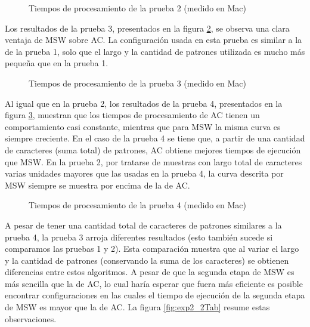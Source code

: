 {\begin{figure}[H]
{	\label{fig:Prueba2Tab_c}}
\quad
\caption{Tiempos de procesamiento de la prueba 2 (medido en Mac)}
\label{fig:Prueba2Tab}
\end{figure}
Los resultados de la prueba 3, presentados en la figura \ref{fig:Prueba3Tab}, se observa una clara ventaja de MSW sobre AC. La configuración usada en esta prueba es similar a la de la prueba 1, solo que el largo y la cantidad de patrones utilizada es mucho más pequeña que en la prueba 1.
\begin{figure}[H]
\centering
\quad
\quad
\quad
\caption{Tiempos de procesamiento de la prueba 3 (medido en Mac)}
\label{fig:Prueba3Tab}
\end{figure}
Al igual que en la prueba 2, los resultados de la prueba 4, presentados en la figura \ref{fig:Prueba4Tab}, muestran que los tiempos de procesamiento de AC tienen un comportamiento casi constante, mientras que para MSW la misma curva es siempre creciente. En el caso de la prueba 4 se tiene que, a partir de una cantidad de caracteres (suma total) de patrones, AC obtiene mejores tiempos de ejecución que MSW. En la prueba 2, por tratarse de muestras con largo total de caracteres varias unidades mayores que las usadas en la prueba 4, la curva descrita por MSW siempre se muestra por encima de la de AC.
\begin{figure}[H]
\centering
\quad
\quad
\quad
\caption{Tiempos de procesamiento de la prueba 4 (medido en Mac)}
\label{fig:Prueba4Tab}
\end{figure}
A pesar de tener una cantidad total de caracteres de patrones similares a la prueba 4, la prueba 3 arroja diferentes resultados (esto también sucede si comparamos las pruebas 1 y 2). Esta comparación muestra que al variar el largo y la cantidad de patrones (conservando la suma de los caracteres) se obtienen diferencias entre estos algoritmos.
A pesar de que la segunda etapa de MSW es más sencilla que la de AC, lo cual haría esperar que fuera más eficiente es posible encontrar configuraciones en las cuales el tiempo de ejecución de la segunda etapa de MSW es mayor que la de  AC.
La figura \ref{fig:exp2_2Tab} resume estas observaciones.
\begin{figure}[H]


\end{figure}}

